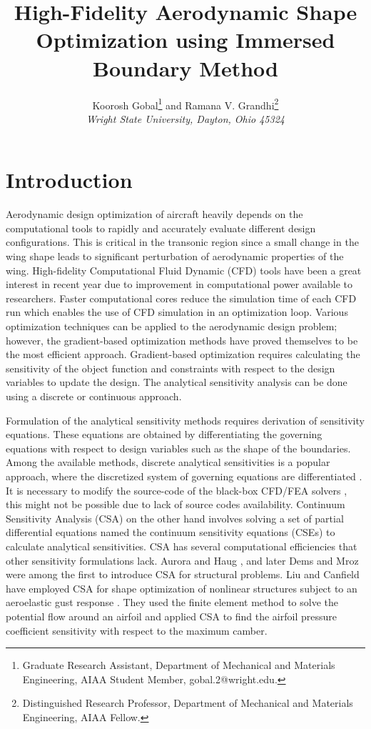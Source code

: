 \documentclass[12pt]{aiaa-pretty}
\author[Gobal and Grandhi]{ %
Koorosh Gobal\thanks{Graduate Research Assistant, Department of Mechanical and Materials Engineering, AIAA Student Member, gobal.2@wright.edu.} and
Ramana V. Grandhi\thanks{Distinguished Research Professor, Department of Mechanical and Materials Engineering, AIAA Fellow.}\\
\textit{Wright State University, Dayton, Ohio 45324}}
\title{High-Fidelity Aerodynamic Shape Optimization using Immersed Boundary Method}
\begin{document}
\maketitle
\section{Introduction}
Aerodynamic design optimization of aircraft heavily depends on the computational tools to rapidly and accurately evaluate different design configurations. This is critical in the transonic region since a small change in the wing shape leads to significant perturbation of aerodynamic properties of the wing. High-fidelity Computational Fluid Dynamic (CFD) tools have been a great interest in recent year due to improvement in computational power available to researchers. Faster computational cores reduce the simulation time of each CFD run which enables the use of CFD simulation in an optimization loop. Various optimization techniques can be applied to the aerodynamic design problem; however, the gradient-based optimization methods have proved themselves to be the most efficient approach. Gradient-based optimization requires calculating the sensitivity of the object function and constraints with respect to the design variables to update the design. The analytical sensitivity analysis can be done using a discrete or continuous approach.

Formulation of the analytical sensitivity methods requires derivation of sensitivity equations. These equations are obtained by differentiating the governing equations with respect to design variables such as the shape of the boundaries. Among the available methods, discrete analytical sensitivities is a popular approach, where the discretized system of governing equations are differentiated \cite{martins2013review}. It is necessary to modify the source-code of the black-box CFD/FEA solvers \cite{cross2014local}, this might not be possible due to lack of source codes availability. Continuum Sensitivity Analysis (CSA) on the other hand involves solving a set of partial differential equations named the continuum sensitivity equations (CSEs) to calculate analytical sensitivities. CSA has several computational efficiencies that other sensitivity formulations lack. Aurora and Haug \cite{Arora}, and later Dems and Mroz \cite{Dems-Mroz} were among the first to introduce CSA for structural problems. Liu and Canfield have employed CSA for shape optimization of nonlinear structures subject to an aeroelastic gust response \cite{liu2013equivalence}. They used the finite element method to solve the potential flow around an airfoil and applied CSA to find the airfoil pressure coefficient sensitivity with respect to the maximum camber.
\end{document}
